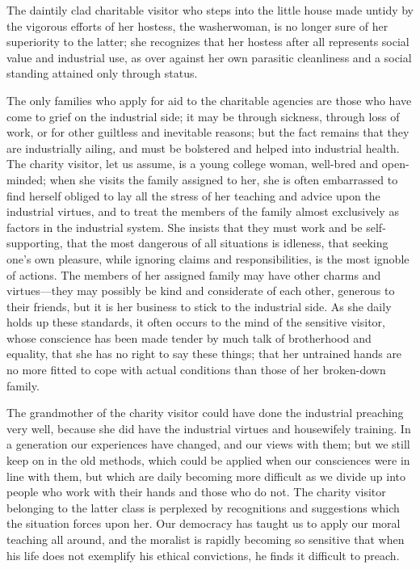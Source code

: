 \documentclass[]{article}
\begin{document}
\begin{sectionbody}
\addamsparagraph The daintily clad charitable visitor who steps into the little house
made untidy by the vigorous efforts of her hostess, the washerwoman, is
no longer sure of her superiority to the latter; she recognizes that her
hostess after all represents social value and industrial use, as over
against her own parasitic cleanliness and a social standing attained
only through status.

\addamsparagraph The only families who apply for aid to the charitable agencies are those
who have come to grief on the industrial side; it may be through
sickness, through loss of work, or for other guiltless and inevitable
reasons; but the fact remains that they are industrially ailing, and
must be bolstered and helped into industrial health. The charity
visitor, let us assume, is a young college woman, well-bred and
open-minded; when she visits the family assigned to her, she is often
embarrassed to find herself obliged to lay all the stress of her
teaching and advice upon the industrial virtues, and to treat the
members of the family almost exclusively as factors in the industrial
system. She insists that they must work and be self-supporting, that the
most dangerous of all situations is idleness, that seeking one's own
pleasure, while ignoring claims and responsibilities, is the most
ignoble of actions. The members of her assigned family may have other
charms and virtues---they may possibly be kind and considerate of each
other, generous to their friends, but it is her business to stick to the
industrial side. As she daily holds up these standards, it often occurs
to the mind of the sensitive visitor, whose conscience has been made
tender by much talk of brotherhood and equality, that she has no right
to say these things; that her untrained hands are no more fitted to
cope with actual conditions than those of her broken-down family.

\addamsparagraph The grandmother of the charity visitor could have done the industrial
preaching very well, because she did have the industrial virtues and
housewifely training. In a generation our experiences have changed, and
our views with them; but we still keep on in the old methods, which
could be applied when our consciences were in line with them, but which
are daily becoming more difficult as we divide up into people who work
with their hands and those who do not. The charity visitor belonging to
the latter class is perplexed by recognitions and suggestions which the
situation forces upon her. Our democracy has taught us to apply our
moral teaching all around, and the moralist is rapidly becoming so
sensitive that when his life does not exemplify his ethical convictions,
he finds it difficult to preach.


\end{sectionbody}
\end{document}
